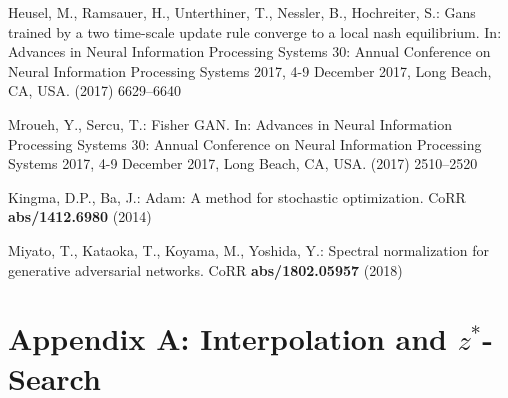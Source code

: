 \documentclass[runningheads]{llncs}
\begin{document}
\begin{thebibliography}{10}
Heusel, M., Ramsauer, H., Unterthiner, T., Nessler, B., Hochreiter, S.:
\newblock Gans trained by a two time-scale update rule converge to a local nash
  equilibrium.
\newblock In: Advances in Neural Information Processing Systems 30: Annual
  Conference on Neural Information Processing Systems 2017, 4-9 December 2017,
  Long Beach, CA, {USA}. (2017)  6629--6640

Mroueh, Y., Sercu, T.:
\newblock Fisher {GAN}.
\newblock In: Advances in Neural Information Processing Systems 30: Annual
  Conference on Neural Information Processing Systems 2017, 4-9 December 2017,
  Long Beach, CA, {USA}. (2017)  2510--2520

Kingma, D.P., Ba, J.:
\newblock Adam: {A} method for stochastic optimization.
\newblock CoRR \textbf{abs/1412.6980} (2014)

Miyato, T., Kataoka, T., Koyama, M., Yoshida, Y.:
\newblock Spectral normalization for generative adversarial networks.
\newblock CoRR \textbf{abs/1802.05957} (2018)

\end{thebibliography}
     
    \clearpage
    
    \setcounter{secnumdepth}{0}
    
    \section{Appendix A: Interpolation and $z^*$-Search}
    
    \vfill
    
\end{document}
